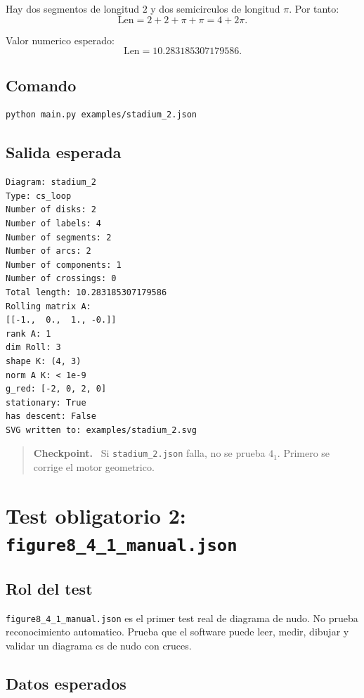 \documentclass[11pt,letterpaper]{amsart}
\newcommand{\Len}{\mathrm{Len}}
\newenvironment{checkpoint}
{\par\medskip\noindent\begin{quote}\textbf{Checkpoint.}\ }
{\end{quote}\par\medskip}
\begin{document}
Hay dos segmentos de longitud \(2\) y dos semicirculos de longitud \(\pi\).
Por tanto:
\[
\Len=2+2+\pi+\pi=4+2\pi.
\]

Valor numerico esperado:
\[
\Len=10.283185307179586.
\]

\subsection{Comando}

\begin{verbatim}
python main.py examples/stadium_2.json
\end{verbatim}

\subsection{Salida esperada}

\begin{verbatim}
Diagram: stadium_2
Type: cs_loop
Number of disks: 2
Number of labels: 4
Number of segments: 2
Number of arcs: 2
Number of components: 1
Number of crossings: 0
Total length: 10.283185307179586
Rolling matrix A:
[[-1.,  0.,  1., -0.]]
rank A: 1
dim Roll: 3
shape K: (4, 3)
norm A K: < 1e-9
g_red: [-2, 0, 2, 0]
stationary: True
has descent: False
SVG written to: examples/stadium_2.svg
\end{verbatim}

\begin{checkpoint}
Si \texttt{stadium\_2.json} falla, no se prueba \(4_1\). Primero se corrige el
motor geometrico.
\end{checkpoint}

\section{Test obligatorio 2: \texttt{figure8\_4\_1\_manual.json}}

\subsection{Rol del test}

\texttt{figure8\_4\_1\_manual.json} es el primer test real de diagrama de nudo.
No prueba reconocimiento automatico. Prueba que el software puede leer, medir,
dibujar y validar un diagrama cs de nudo con cruces.

\subsection{Datos esperados}
\end{document}
